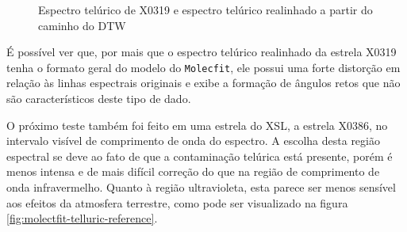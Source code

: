 \begin{figure}[htb]
  \centering
  \hfill
  \caption{Espectro telúrico de X0319 e espectro telúrico realinhado a partir do caminho do DTW}
  \label{fig:x0319-realigned-telluric}
\end{figure}

É possível ver que, por mais que o espectro telúrico realinhado da estrela X0319 tenha o formato geral do modelo do \texttt{Molecfit}, ele possui uma forte distorção em relação às linhas espectrais originais e exibe a formação de ângulos retos que não são característicos deste tipo de dado.

O próximo teste também foi feito em uma estrela do XSL, a estrela X0386, no intervalo visível de comprimento de onda do espectro. A escolha desta região espectral se deve ao fato de que a contaminação telúrica está presente, porém é menos intensa e de mais difícil correção do que na região de comprimento de onda infravermelho. Quanto à região ultravioleta, esta parece ser menos sensível aos efeitos da atmosfera terrestre, como pode ser visualizado na figura \ref{fig:molectfit-telluric-reference}.


